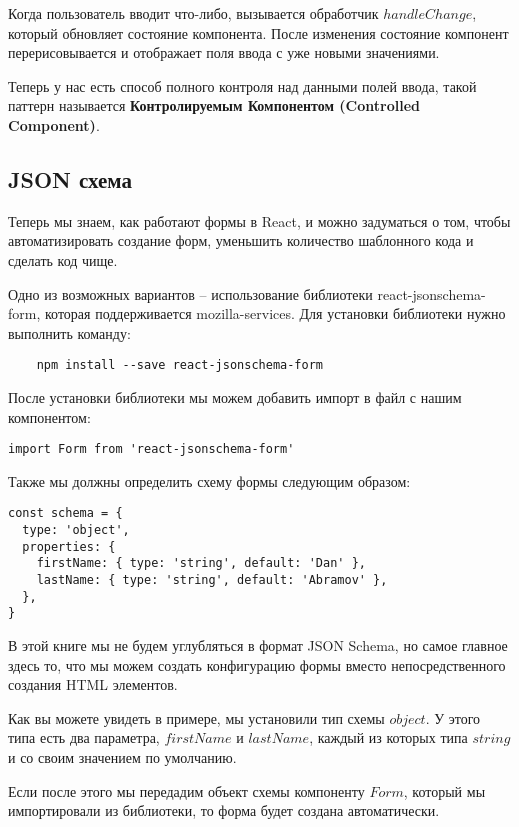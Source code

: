 Когда пользователь вводит что-либо, вызывается обработчик $handleChange$, который обновляет состояние компонента. После изменения состояние компонент перерисовывается и отображает поля ввода с уже новыми значениями.

Теперь у нас есть способ полного контроля над данными полей ввода, такой паттерн называется \textbf{Контролируемым Компонентом (Controlled Component)}.

\subsection{JSON схема}

Теперь мы знаем, как работают формы в React, и можно задуматься о том, чтобы автоматизировать создание форм, уменьшить количество шаблонного кода и сделать код чище.

Одно из возможных вариантов -- использование библиотеки react-jsonschema-form, которая поддерживается mozilla-services. Для установки библиотеки нужно выполнить команду:

\begin{lstlisting}
	npm install --save react-jsonschema-form
\end{lstlisting}

После установки библиотеки мы можем добавить импорт в файл с нашим компонентом:

\begin{lstlisting}
import Form from 'react-jsonschema-form'
\end{lstlisting}

Также мы должны определить схему формы следующим образом:

\begin{lstlisting}
const schema = {
  type: 'object',
  properties: {
    firstName: { type: 'string', default: 'Dan' },
    lastName: { type: 'string', default: 'Abramov' },
  },
}
\end{lstlisting}

В этой книге мы не будем углубляться в формат JSON Schema, но самое главное здесь то, что мы можем создать конфигурацию формы вместо непосредственного создания HTML элементов.

Как вы можете увидеть в примере, мы установили тип схемы $object$. У этого типа есть два параметра, $firstName$ и $lastName$, каждый из которых типа $string$ и со своим значением по умолчанию.

Если после этого мы передадим объект схемы компоненту $Form$, который мы импортировали из библиотеки, то форма будет создана автоматически.


